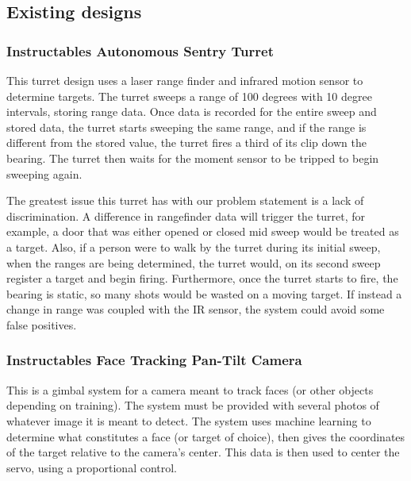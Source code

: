 ﻿%


\subsection{Existing designs}

\subsubsection{Instructables Autonomous Sentry Turret}
This turret design uses a laser range finder and infrared motion sensor to determine targets. The turret sweeps a range of 100 degrees with 10 degree intervals, storing range data. Once data is recorded for the entire sweep and stored data, the turret starts sweeping the same range, and if the range is different from the stored value, the turret fires a third of its clip down the bearing. The turret then waits for the moment sensor to be tripped to begin sweeping again.

The greatest issue this turret has with our problem statement is a lack of discrimination. A difference in rangefinder data will trigger the turret, for example, a door that was either opened or closed mid sweep would be treated as a target. Also, if a person were to walk by the turret during its initial sweep, when the ranges are being determined, the turret would, on its second sweep register a target and begin firing. Furthermore, once the turret starts to fire, the bearing is static, so many shots would be wasted on a moving target. If instead a change in range was coupled with the IR sensor, the system could avoid some false positives.

\subsubsection{Instructables Face Tracking Pan-Tilt Camera}
This is a gimbal system for a camera meant to track faces (or other objects depending on training). The system must be provided with several photos of whatever image it is meant to detect. The system uses machine learning to determine what constitutes a face (or target of choice), then gives the coordinates of the target relative to the camera’s center. This data is then used to center the servo, using a proportional control.
        
